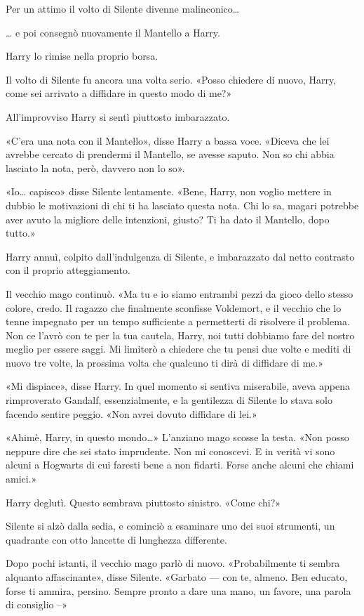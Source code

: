 Per un attimo il volto di Silente divenne malinconico…

… e poi consegnò nuovamente il Mantello a Harry.

Harry lo rimise nella proprio borsa.

Il volto di Silente fu ancora una volta serio. «Posso chiedere di nuovo, Harry, come sei arrivato a diffidare in questo modo di me?»

All’improvviso Harry si sentì piuttosto imbarazzato.

«C’era una nota con il Mantello», disse Harry a bassa voce. «Diceva che lei avrebbe cercato di prendermi il Mantello, se avesse saputo. Non so chi abbia lasciato la nota, però, davvero non lo so».

«Io… capisco» disse Silente lentamente. «Bene, Harry, non voglio mettere in dubbio le motivazioni di chi ti ha lasciato questa nota. Chi lo sa, magari potrebbe aver avuto la migliore delle intenzioni, giusto? Ti ha dato il Mantello, dopo tutto.»

Harry annuì, colpito dall’indulgenza di Silente, e imbarazzato dal netto contrasto con il proprio atteggiamento.

Il vecchio mago continuò. «Ma tu e io siamo entrambi pezzi da gioco dello stesso colore, credo. Il ragazzo che finalmente sconfisse Voldemort, e il vecchio che lo tenne impegnato per un tempo sufficiente a permetterti di risolvere il problema. Non ce l’avrò con te per la tua cautela, Harry, noi tutti dobbiamo fare del nostro meglio per essere saggi. Mi limiterò a chiedere che tu pensi due volte e mediti di nuovo tre volte, la prossima volta che qualcuno ti dirà di diffidare di me.»

«Mi dispiace», disse Harry. In quel momento si sentiva miserabile, aveva appena rimproverato Gandalf, essenzialmente, e la gentilezza di Silente lo stava solo facendo sentire peggio. «Non avrei dovuto diffidare di lei.»

«Ahimè, Harry, in questo mondo…» L’anziano mago scosse la testa. «Non posso neppure dire che sei stato imprudente. Non mi conoscevi. E in verità vi sono alcuni a Hogwarts di cui faresti bene a non fidarti. Forse anche alcuni che chiami amici.»

Harry deglutì. Questo sembrava piuttosto sinistro. «Come chi?»

Silente si alzò dalla sedia, e cominciò a esaminare uno dei suoi strumenti, un quadrante con otto lancette di lunghezza differente.

Dopo pochi istanti, il vecchio mago parlò di nuovo. «Probabilmente ti sembra alquanto affascinante», disse Silente. «Garbato — con te, almeno. Ben educato, forse ti ammira, persino. Sempre pronto a dare una mano, un favore, una parola di consiglio –»

